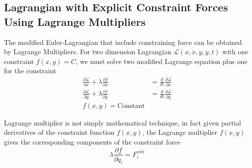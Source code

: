 \documentclass[../../../main.tex]{subfiles}
\begin{document}
\subsection{Lagrangian with Explicit Constraint Forces Using Lagrange Multipliers}
The modified Euler-Lagrangian that include constraining force can be obtained by Lagrange Multipliers.
For two dimension Lagrangian $\mathcal{L}(x,\dot{x},y,\dot{y},t)$ with one constraint $f(x,y)=C$, we must solve two modified Lagrange equation plus one for the constraint
\begin{align*}
	\frac{\partial \mathcal{L}}{\partial x}+\lambda\frac{\partial f}{\partial x} & =\frac{d}{dt}\frac{\partial \mathcal{L}}{\partial \dot{x}} \\
	\frac{\partial \mathcal{L}}{\partial y}+\lambda\frac{\partial f}{\partial y} & =\frac{d}{dt}\frac{\partial \mathcal{L}}{\partial \dot{y}} \\
	f(x,y)=\text{Constant}
\end{align*}

Lagrange multiplier is not simply mathematical technique, in fact given partial derivatives of the constraint function $f (x, y)$, the Lagrange multiplier $f(x,y)$ gives the corresponding components of the constraint force
\begin{equation*}
	\lambda\frac{\partial f}{\partial q_i}=F_i^{\text{cstr}}
\end{equation*}
\end{document}
